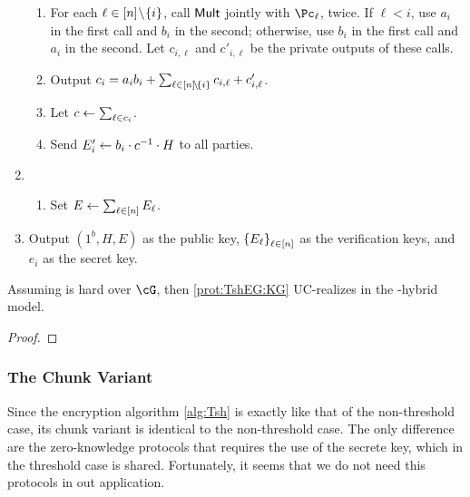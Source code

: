 \begin{protocol}
\begin{enumerate}
\begin{enumerate}
			\item For each $\ell \in [n]\!\setminus\!\{i\}$, call $\mathsf{Mult}$ jointly with $\Pc_\ell$, twice. If $\ell < i$, use $a_i$ in the first call and $b_i$ in the second; otherwise, use  $b_i$ in the first call and $a_i$ in the second.    Let $c_{i,\ell}$ and $c'_{i,\ell}$ be the private  outputs of these calls.
			
			\item Output $c_i = a_i b_i  + \sum_{\ell \in  [n]\!\setminus\!\{i\}} c_{i,\ell} + c_{i,\ell}'$.
			
			\item Let $c \leftarrow \sum_{\ell \in c_i}$.
			 
			
			
			
			
			
			\item Send $E'_i \leftarrow b_i \cdot c^{-1} \cdot H$ to all parties.
			
			
		\end{enumerate}
		
		\item {}
		
		\begin{enumerate}
			\item 	Set $E \leftarrow \sum_{\ell \in [n]} E_\ell$.
		\end{enumerate}
	
		
		\item Output $(1^b,H,E)$ as the public key, $\set{E_\ell}_{\ell \in [n]}$ as the verification keys, and $e_i$ as the secret key.
			
		\end{enumerate}
	
	
\end{protocol}


\begin{theorem}\label{thm:TshEG:KG}
	Assuming \DDH is hard over $\cG$, then \cref{prot:TshEG:KG} UC-realizes \tdKg in the \sset{\randomH,{\Mult}}-hybrid model.
\end{theorem}
\begin{proof}
\end{proof}


\subsubsection{The Chunk Variant}\label{sec:ChanksEg:TshEG:Chunk}	
Since the encryption algorithm  \cref{alg:Tsh} is exactly like that of the non-threshold case, its chunk variant is identical to the non-threshold case. The only difference are the zero-knowledge protocols  that requires the use of the secrete key, which in the threshold case is shared. Fortunately, it seems that  we do not need this protocols in out application.

